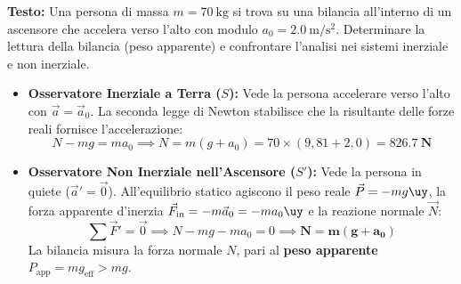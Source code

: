 \begin{esercizio}
\textbf{Testo:}
Una persona di massa $m = \SI{70}{\kilogram}$ si trova su una bilancia all'interno di un ascensore che accelera verso l'alto con modulo $a_0 = \SI{2.0}{\metre\per\second\squared}$. Determinare la lettura della bilancia (peso apparente) e confrontare l'analisi nei sistemi inerziale e non inerziale.
\end{esercizio}

\begin{center}
\end{center}

\begin{tcolorbox}[enhanced, breakable, colback=forestgreen!5!white, colframe=forestgreen!80!black,
    title={\textbf{Confronto tra Sistema Inerziale e Riferimento Non Inerziale}}, fonttitle=\bfseries\sffamily]
\begin{itemize}
    \item \textbf{Osservatore Inerziale a Terra ($S$):}
    Vede la persona accelerare verso l'alto con $\vec{a} = \vec{a}_0$. La seconda legge di Newton stabilisce che la risultante delle forze reali fornisce l'accelerazione:
    \begin{equation}
        N - mg = m a_0 \implies N = m(g + a_0) = 70 \times (9{,}81 + 2{,}0) = \mathbf{\SI{826.7}{\newton}}
    \end{equation}
    \item \textbf{Osservatore Non Inerziale nell'Ascensore ($S'$):}
    Vede la persona in quiete ($\vec{a}' = \vec{0}$). All'equilibrio statico agiscono il peso reale $\vec{P} = -mg\uy$, la forza apparente d'inerzia $\vec{F}_{\text{in}} = -m\vec{a}_0 = -m a_0\uy$ e la reazione normale $\vec{N}$:
    \begin{equation}
        \sum \vec{F}' = \vec{0} \implies N - mg - m a_0 = 0 \implies \mathbf{N = m(g + a_0)}
    \end{equation}
    La bilancia misura la forza normale $N$, pari al \textbf{peso apparente} $P_{\text{app}} = m g_{\text{eff}} > mg$.
\end{itemize}
\end{tcolorbox}
